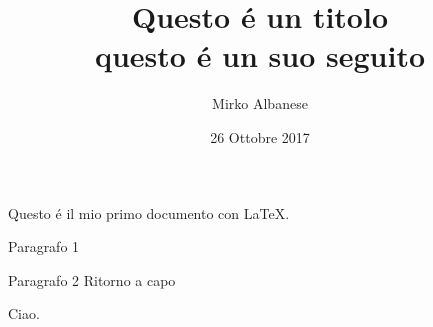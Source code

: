 \documentclass[a4paper, 11pt]{article}
\title{Questo \'e un titolo \\ questo \'e un suo seguito}
\author{Mirko Albanese}
\date{26 Ottobre 2017}
\begin{document}
\maketitle

Questo \'e il mio primo documento con \LaTeX.

Paragrafo 1

Paragrafo 2 
Ritorno a capo

\vspace{4cm}

Ciao.
\end{document}
